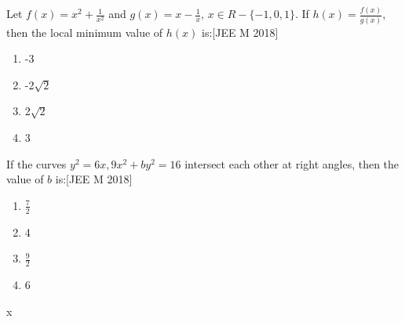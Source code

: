 \item Let $f(x)=x^{2}+\frac{1}{x^2}$ and $g(x)=x-\frac{1}{x}$, $x \in R-{\{-1,0,1}\}$. If $h(x)=\frac{f(x)}{g(x)}$, then the local minimum value of $h(x)$ is:\hfill[JEE M 2018]\\
\begin{enumerate}
    \item  -3\\
    \item  -2$\sqrt{2}$\\
    \item   2$\sqrt{2}$\\
    \item   3\\
\end{enumerate}
\item If the curves $y^2=6x, 9x^2+by^2=16$ intersect each other at right angles, then the value of $b$ is:\hfill[JEE M 2018]\\
\begin{enumerate}
    \item  $\frac{7}{2}$\\
    \item  4\\
    \item  $\frac{9}{2}$\\
    \item  6\\
\end{enumerate}
x
